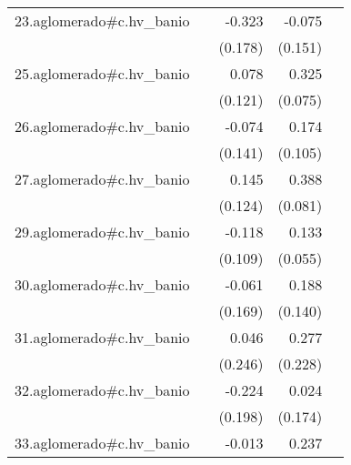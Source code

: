 {\begin{longtable}{l*{4}{D{.}{.}{-1}}}
\addlinespace
23.aglomerado#c.hv\_banio&                     &      -0.323         &      -0.075         &                     \\
            &                     &     (0.178)         &     (0.151)         &                     \\
\addlinespace
25.aglomerado#c.hv\_banio&                     &       0.078         &       0.325\sym{***}&                     \\
            &                     &     (0.121)         &     (0.075)         &                     \\
\addlinespace
26.aglomerado#c.hv\_banio&                     &      -0.074         &       0.174         &                     \\
            &                     &     (0.141)         &     (0.105)         &                     \\
\addlinespace
27.aglomerado#c.hv\_banio&                     &       0.145         &       0.388\sym{***}&                     \\
            &                     &     (0.124)         &     (0.081)         &                     \\
\addlinespace
29.aglomerado#c.hv\_banio&                     &      -0.118         &       0.133\sym{*}  &                     \\
            &                     &     (0.109)         &     (0.055)         &                     \\
\addlinespace
30.aglomerado#c.hv\_banio&                     &      -0.061         &       0.188         &                     \\
            &                     &     (0.169)         &     (0.140)         &                     \\
\addlinespace
31.aglomerado#c.hv\_banio&                     &       0.046         &       0.277         &                     \\
            &                     &     (0.246)         &     (0.228)         &                     \\
\addlinespace
32.aglomerado#c.hv\_banio&                     &      -0.224         &       0.024         &                     \\
            &                     &     (0.198)         &     (0.174)         &                     \\
\addlinespace
33.aglomerado#c.hv\_banio&                     &      -0.013         &       0.237\sym{***}&                     \\

\end{longtable}}
